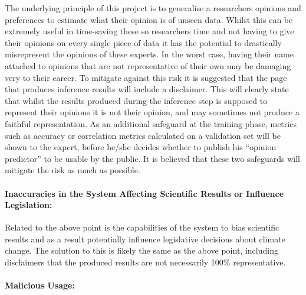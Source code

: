 \documentclass{ecmm427_assignment}
\begin{document}
 The underlying principle of this project is to generalise a researchers
opinions and preferences to estimate what their opinion is of unseen
data. Whilst this can be extremely useful in time-saving these so
researchers time and not having to give their opinions on every single
piece of data it has the potential to drastically misrepresent the
opinions of these experts. In the worst case, having their name attached
to opinions that are not representative of their own may be damaging
very to their career. To mitigate against this risk it is suggested
that the page that produces inference results will include a disclaimer. This will clearly state that whilst the results produced during the inference
step is supposed to represent their opinions it is not their opinion,
and may sometimes not produce a faithful representation. As an additional
safeguard at the training phase, metrics such as accuracy or correlation
metrics calculated on a validation set will be shown to the expert,
before he/she decides whether to publish his ``opinion predictor''
to be usable by the public. It is believed that these two safeguards
will mitigate the risk as much as possible.

\paragraph{Inaccuracies in the System Affecting Scientific Results or Influence
Legislation: }

 Related to the above point is the capabilities of the system to bias
scientific results and as a result potentially influence legislative
decisions about climate change. The solution to this is likely the
same as the above point, including disclaimers that the produced results
are not necessarily 100\% representative. 

\paragraph{Malicious Usage:}
\end{document}
